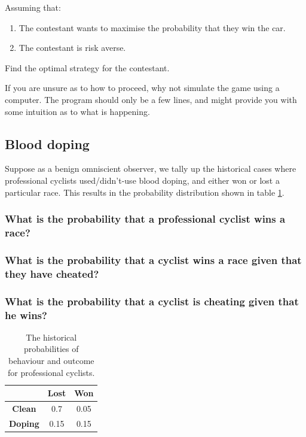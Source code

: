 \documentclass[11pt,fullpage]{book}
\begin{document}
Assuming that:

\begin{enumerate}
\item The contestant wants to maximise the probability that they win the car.
\item The contestant is risk averse.
\end{enumerate}

Find the optimal strategy for the contestant.

If you are unsure as to how to proceed, why not simulate the game using a computer. The program should only be a few lines, and might provide you with some intuition as to what is happening.

\subsection{Blood doping}
Suppose as a benign omniscient observer, we tally up the historical cases where professional cyclists used/didn't-use blood doping, and either won or lost a particular race. This results in the probability distribution shown in table \ref{tab:Probability_PS_bloodDoping}.

\subsubsection{What is the probability that a professional cyclist wins a race?}
\subsubsection{What is the probability that a cyclist wins a race given that they have cheated?}
\subsubsection{What is the probability that a cyclist is cheating given that he wins?}

\begin{table}[htbp]
  \centering
    \begin{tabular}{ccc}
    \toprule
          & \textbf{Lost} & \textbf{Won} \\
    \midrule
    \textbf{Clean} & 0.7   & 0.05 \\
    \textbf{Doping} & 0.15  & 0.15 \\
    \bottomrule
    \end{tabular}%
    \caption{The historical probabilities of behaviour and outcome for professional cyclists.}
  \label{tab:Probability_PS_bloodDoping}%
\end{table}%
\end{document}
